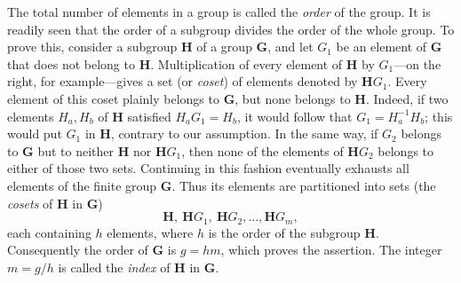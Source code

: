 The total number of elements in a group is called the \emph{order} of the 
group.  It is readily seen that the order of a subgroup divides the order of 
the whole
group.  To prove this, consider a subgroup $\boldsymbol{H}$ of a group 
$\boldsymbol{G}$, and let $G_1$ be an element of $\boldsymbol{G}$ that does not 
belong to $\boldsymbol{H}$.  Multiplication of every element of 
$\boldsymbol{H}$ by $G_1$---on the right, for example---gives a set (or 
\emph{coset}) of elements denoted by $\boldsymbol{H}G_1$.  Every element of 
this coset plainly belongs to $\boldsymbol{G}$, but none belongs to 
$\boldsymbol{H}$.  Indeed, if two elements $H_a,H_b$ of $\boldsymbol{H}$ 
satisfied $H_aG_1=H_b$, it would follow that 
$G_1=H_a^{-1}H_b$; this would put $G_1$ in $\boldsymbol{H}$, contrary to our 
assumption.  In the same way, if $G_2$ belongs to $\boldsymbol{G}$ but to 
neither $\boldsymbol{H}$ nor $\boldsymbol{H}G_1$, then none of the elements of 
$\boldsymbol{H}G_2$ belongs to either of those two sets.  Continuing in this 
fashion eventually exhausts all elements of the finite group 
$\boldsymbol{G}$.  Thus its elements are partitioned into sets (the 
\emph{cosets} of $\boldsymbol{H}$ in $\boldsymbol{G}$)
\[
\boldsymbol{H},\ \boldsymbol{H}G_1,\ \boldsymbol{H}G_2,\ldots,\boldsymbol{H}G_m,
\]
each containing $h$ elements, where $h$ is the order of the subgroup 
$\boldsymbol{H}$.  Consequently the order of $\boldsymbol{G}$ is $g=hm$, 
which proves the assertion.  The integer $m=g/h$ is called the \emph{index} 
of $\boldsymbol{H}$ in $\boldsymbol{G}$.

